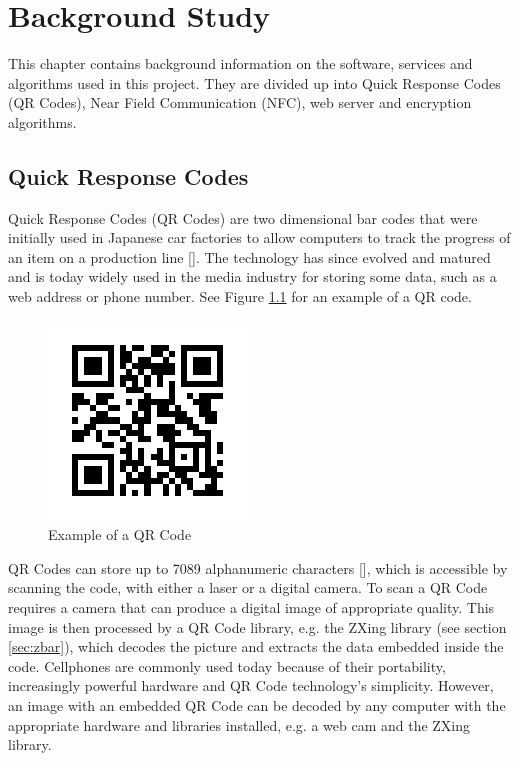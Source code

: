 \chapter{Background Study}

This chapter contains background information on the software, services and algorithms used
in this project. They are divided up into Quick Response Codes (QR Codes), Near Field
Communication (NFC), web server and encryption algorithms. 

\section{Quick Response Codes}

Quick Response Codes (QR Codes) are two dimensional bar codes that were initially
 used in Japanese car factories to allow computers to track the progress of
 an item on a production line [\cite{website:denso-qrcode}]. The technology has
 since evolved and matured and is today widely used in the media industry for storing some
 data, such as a web address or phone number. See Figure \ref{qrcode} for an example of a QR
 code.
 
\begin{figure}[h]
\centering
\includegraphics[scale = 0.7]{qrcode_voorbeeld.png}
\caption{Example of a QR Code}
\label{qrcode}
\end{figure}
 
 QR Codes can store up to 7089 alphanumeric characters [\cite{journal:qr-code}], which is
 accessible by scanning the code, with either a laser or a digital camera. To scan a QR Code
 requires a camera that can produce a digital image of appropriate quality. This image is then
 processed by a QR Code library, e.g.
 the ZXing library (see section \ref{sec:zbar}), which decodes the picture and extracts the
 data embedded inside the code. Cellphones are commonly used today because of their
 portability, increasingly powerful hardware and QR Code technology's simplicity.
 However, an image with an embedded QR Code can be decoded by any computer with the
 appropriate hardware and libraries installed, e.g. a web cam and the ZXing library.

